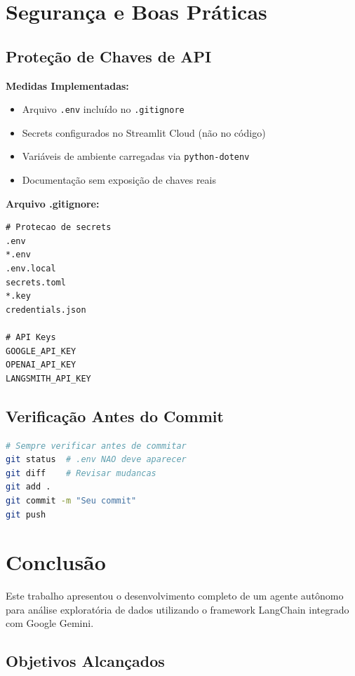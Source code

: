 \documentclass[12pt,a4paper]{article}
\begin{document}
\newpage
\section{Segurança e Boas Práticas}

\subsection{Proteção de Chaves de API}

\textbf{Medidas Implementadas:}

\begin{itemize}
    \item Arquivo \texttt{.env} incluído no \texttt{.gitignore}
    \item Secrets configurados no Streamlit Cloud (não no código)
    \item Variáveis de ambiente carregadas via \texttt{python-dotenv}
    \item Documentação sem exposição de chaves reais
\end{itemize}

\textbf{Arquivo .gitignore:}

\begin{lstlisting}
# Protecao de secrets
.env
*.env
.env.local
secrets.toml
*.key
credentials.json

# API Keys
GOOGLE_API_KEY
OPENAI_API_KEY
LANGSMITH_API_KEY
\end{lstlisting}

\subsection{Verificação Antes do Commit}

\begin{lstlisting}[language=bash]
# Sempre verificar antes de commitar
git status  # .env NAO deve aparecer
git diff    # Revisar mudancas
git add .
git commit -m "Seu commit"
git push
\end{lstlisting}

\newpage
\section{Conclusão}

Este trabalho apresentou o desenvolvimento completo de um agente autônomo para análise exploratória de dados utilizando o framework LangChain integrado com Google Gemini.

\subsection{Objetivos Alcançados}
\end{document}
